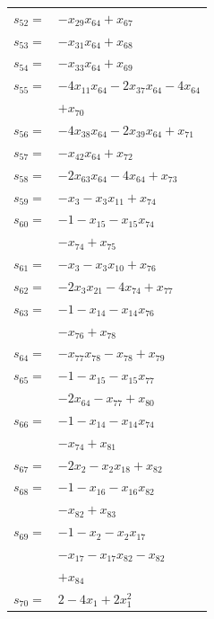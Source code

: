 \begin{longtable}{@{}r@{\;}l@{}}
\(s_{52}=\) & \(\displaystyle -x_{29}x_{64} +x_{67}\) \\[3pt]
\(s_{53}=\) & \(\displaystyle -x_{31}x_{64} +x_{68}\) \\[3pt]
\(s_{54}=\) & \(\displaystyle -x_{33}x_{64} +x_{69}\) \\[3pt]
\(s_{55}=\) & \(\displaystyle -4x_{11}x_{64} -2x_{37}x_{64} -4x_{64}\) \\
 & \(\displaystyle +x_{70}\) \\[3pt]
\(s_{56}=\) & \(\displaystyle -4x_{38}x_{64} -2x_{39}x_{64} +x_{71}\) \\[3pt]
\(s_{57}=\) & \(\displaystyle -x_{42}x_{64} +x_{72}\) \\[3pt]
\(s_{58}=\) & \(\displaystyle -2x_{63}x_{64} -4x_{64} +x_{73}\) \\[3pt]
\(s_{59}=\) & \(\displaystyle -x_{3} -x_{3}x_{11} +x_{74}\) \\[3pt]
\(s_{60}=\) & \(\displaystyle -1 -x_{15} -x_{15}x_{74}\) \\
 & \(\displaystyle -x_{74} +x_{75}\) \\[3pt]
\(s_{61}=\) & \(\displaystyle -x_{3} -x_{3}x_{10} +x_{76}\) \\[3pt]
\(s_{62}=\) & \(\displaystyle -2x_{3}x_{21} -4x_{74} +x_{77}\) \\[3pt]
\(s_{63}=\) & \(\displaystyle -1 -x_{14} -x_{14}x_{76}\) \\
 & \(\displaystyle -x_{76} +x_{78}\) \\[3pt]
\(s_{64}=\) & \(\displaystyle -x_{77}x_{78} -x_{78} +x_{79}\) \\[3pt]
\(s_{65}=\) & \(\displaystyle -1 -x_{15} -x_{15}x_{77}\) \\
 & \(\displaystyle -2x_{64} -x_{77} +x_{80}\) \\[3pt]
\(s_{66}=\) & \(\displaystyle -1 -x_{14} -x_{14}x_{74}\) \\
 & \(\displaystyle -x_{74} +x_{81}\) \\[3pt]
\(s_{67}=\) & \(\displaystyle -2x_{2} -x_{2}x_{18} +x_{82}\) \\[3pt]
\(s_{68}=\) & \(\displaystyle -1 -x_{16} -x_{16}x_{82}\) \\
 & \(\displaystyle -x_{82} +x_{83}\) \\[3pt]
\(s_{69}=\) & \(\displaystyle -1 -x_{2} -x_{2}x_{17}\) \\
 & \(\displaystyle -x_{17} -x_{17}x_{82} -x_{82}\) \\
 & \(\displaystyle +x_{84}\) \\[3pt]
\(s_{70}=\) & \(\displaystyle 2 -4x_{1} +2x_{1}^{2}\) \\

\end{longtable}

